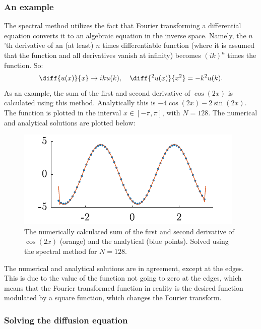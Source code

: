 \documentclass[a4paper,10pt]{article} 	%
\numberwithin{equation}{section}
\begin{document}
	\subsubsection{An example}
	The spectral method utilizes the fact that Fourier transforming a differential equation converts it to an algebraic equation in the inverse space. Namely, the $ n $'th derivative of an (at least) $ n $ times differentiable function (where it is assumed that the function and all derivatives vanish at infinity) becomes $ (ik)^n $ times the function. So:
	\begin{equation}\label{key}
		\diff{u(x)}{x} \to ik u(k), \quad \diff{^2u(x)}{x^2} = -k^2 u(k).
	\end{equation}
	As an example, the sum of the first and second derivative of $ \cos(2x) $ is calculated using this method. Analytically this is $ -4\cos(2x) -2 \sin(2x) $. The function is plotted in the interval $ x \in [-\pi,\pi] $, with $ N=128 $. The numerical and analytical solutions are plotted below:
	\begin{figure}[H]
		\centering
		\includegraphics[width = 0.5\linewidth]{spectralEx.pdf}
		\caption{The numerically calculated sum of the first and second derivative of $ \cos(2x) $ (orange) and the analytical (blue points). Solved using the spectral method for $ N=128 $.}
		\label{fig:spectralEx}
	\end{figure}
	The numerical and analytical solutions are in agreement, except at the edges. This is due to the value of the function not going to zero at the edges, which means that the Fourier transformed function in reality is the desired function modulated by a square function, which changes the Fourier transform.
	
	\subsubsection{Solving the diffusion equation}
	
	
	
\end{document}

